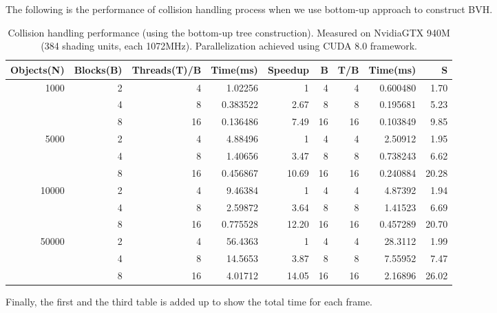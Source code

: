 \documentclass[11pt]{article}
\begin{document}
The following is the performance of collision handling process when we use bottom-up approach to construct BVH.

\begin{table}[H]
\centering
\begin{tabular}{rrrrrrrrr}
Objects(N) & Blocks(B) & Threads(T)/B & Time(ms) & Speedup & B & T/B & Time(ms) & S\\
\hline
1000 & 2 & 4 & 1.02256 & 1 & 4 & 4 & 0.600480 & 1.70\\
 & 4 & 8 & 0.383522 & 2.67 & 8 & 8 & 0.195681 & 5.23\\
 & 8 & 16 & 0.136486 & 7.49 & 16 & 16 & 0.103849 & 9.85\\
\hline
5000 & 2 & 4 & 4.88496 & 1 & 4 & 4 & 2.50912 & 1.95\\
 & 4 & 8 & 1.40656 & 3.47 & 8 & 8 & 0.738243 & 6.62\\
 & 8 & 16 & 0.456867 & 10.69 & 16 & 16 & 0.240884 & 20.28\\
\hline
10000 & 2 & 4 & 9.46384 & 1 & 4 & 4 & 4.87392 & 1.94\\
 & 4 & 8 & 2.59872 & 3.64 & 8 & 8 & 1.41523 & 6.69\\
 & 8 & 16 & 0.775528 & 12.20 & 16 & 16 & 0.457289 & 20.70\\
\hline
50000 & 2 & 4 & 56.4363 & 1 & 4 & 4 & 28.3112 & 1.99\\
 & 4 & 8 & 14.5653 & 3.87 & 8 & 8 & 7.55952 & 7.47\\
 & 8 & 16 & 4.01712 & 14.05 & 16 & 16 & 2.16896 & 26.02\\
\end{tabular}
\caption{Collision handling performance (using the bottom-up tree construction). Measured on Nvidia\textregistered GTX 940M (384 shading units, each 1072MHz). Parallelization achieved using CUDA 8.0 framework.}

\end{table}

Finally, the first and the third table is added up to show the total time for each frame.
\end{document}
